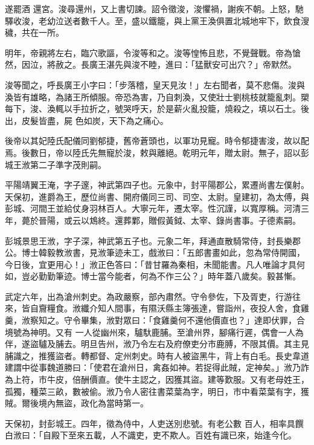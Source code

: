\begin{pinyinscope}
 遂罷酒
 還宮。浚尋還州，又上書切諫。詔令徵浚，浚懼禍，謝疾不朝。上怒，馳驛收浚，老幼泣送者數千人。至，盛以鐵籠，與上黨王渙俱置北城地牢下，飲食溲穢，共在一所。



 明年，帝親將左右，臨穴歌謳，令浚等和之。浚等惶怖且悲，不覺聲戰。帝為愴然，因泣，將赦之。長廣王湛先與浚不睦，進曰：「猛獸安可出穴？」帝默然。



 浚等聞之，呼長廣王小字曰：「步落稽，皇天見汝！」左右聞者，莫不悲傷。浚與渙皆有雄略，為諸王所傾服。帝恐為害，乃自刺渙，又使壯士劉桃枝就籠亂刺。槊每下，浚、渙輒以手拉折之，號哭呼天，於是薪火亂投籠，燒殺之，填以石土。後出，皮髮皆盡，屍
 色如炭，天下為之痛心。



 後帝以其妃陸氏配儀同劉郁捷，舊帝蒼頭也，以軍功見寵。時令郁捷害浚，故以配焉。後數日，帝以陸氏先無寵於浚，敕與離絕。乾明元年，贈太尉。無子，詔以彭城王浟第二子準字茂則嗣。



 平陽靖翼王淹，字子邃，神武第四子也。元象中，封平陽郡公，累遷尚書左僕射。天保初，進爵為王，歷位尚書、開府儀同三司、司空、太尉。皇建初，為太傅，與彭城、河間王並給仗身羽林百人。大寧元年，遷太宰。性沉謹，以寬厚稱。河清三年，薨於晉陽，或云以鴆終。還葬鄴，贈假黃鉞、太宰、錄尚書事。子德素嗣。



 彭城景思王浟，字子深，神武第五子也。元象二年，拜通直散騎常侍，封長樂郡公。博士韓毅教浟書，見浟筆迹未工，戲浟曰：「五郎書畫如此，忽為常侍開國，今日後，宜更用心！」浟正色答曰：「昔甘羅為秦相，未聞能書。凡人唯論才具何如，豈必勤勤筆迹。博士當今能者，何為不作三公？」時年蓋八歲矣。毅甚慚。



 武定六年，出為滄州刺史。為政嚴察，部內肅然。守令參佐，下及胥吏，行游往來，皆自齎糧食。浟纖介知人間事，有隰沃縣主簿張達，嘗詣州，夜投人舍，食雞羹，浟察知之。守令畢集，浟對眾曰：「食雞羹何不還他價直也？」達即伏罪，合境號為神明。又有
 一人從幽州來，驢馱鹿脯。至滄州界，腳痛行遲，偶會一人為伴，遂盜驢及脯去。明旦告州，浟乃令左右及府僚吏分市鹿膊，不限其價。其主見脯識之，推獲盜者。轉都督、定州刺史。時有人被盜黑牛，背上有白毛。長史韋道建謂中從事魏道勝曰：「使君在滄州日，禽姦如神。若捉得此賊，定神矣。」浟乃詐為上符，市牛皮，倍酬價直。使牛主認之，因獲其盜。建等歎服。又有老母姓王，孤獨，種菜三畝，數被偷。浟乃令人密往書菜葉為字，明日，市中看菜葉有字，獲賊。爾後境內無盜，政化為當時第一。



 天保初，封彭城王。四年，徵為侍中，人吏送別悲號。有老公數
 百人，相率具饌白浟曰：「自殿下至來五載，人不識吏，吏不欺人。百姓有識已來，始逢今化。




\end{pinyinscope}
